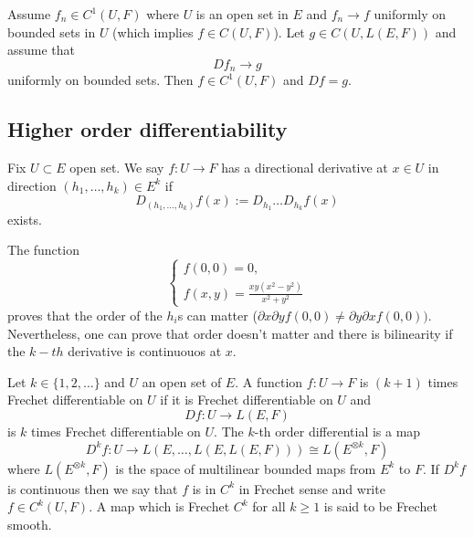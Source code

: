 \begin{prop}
    Assume $f_n \in C^1(U, F)$ where $U$ is an open set in $E$ and $f_n \rightarrow f$ uniformly on bounded sets in $U$ (which implies $f \in C(U,F)$). Let $g \in C(U, L(E,F))$ and assume that
    \begin{equation}
        Df_n \rightarrow g 
    \end{equation}
    uniformly on bounded sets. Then $f \in C^1(U, F)$ and $Df = g.$
\end{prop}

\subsection{Higher order differentiability}

\begin{definition}
    Fix $U \subset E$ open set. We say $f:U \rightarrow F$ has a directional derivative at $x \in U$ in direction $(h_1, \ldots, h_k) \in E^k$ if 
    \begin{equation}
        D_{(h_1, \ldots, h_k)} f(x) := D_{h_1} \ldots D_{h_k} f(x)
    \end{equation}
    exists.
\end{definition}

\begin{observation}
    The function 
    \begin{equation}
        \begin{cases}
            f(0,0) = 0, \\
            f(x,y) = \frac{xy (x^2 - y^2)}{x^2 + y^2}
        \end{cases}
    \end{equation}
    proves that the order of the $h_i$s can matter ($\partial x \partial y f(0,0) \neq \partial y \partial x f(0,0))$.
    Nevertheless, one can prove that order doesn't matter and there is bilinearity if the $k-th$ derivative is continuouos at $x$.
\end{observation}

\begin{definition}
    Let $k \in \{ 1, 2, \ldots\}$ and $U$ an open set of $E$. A function $f: U \rightarrow F$ is $(k + 1)$ times Frechet differentiable on $U$ if it is Frechet differentiable on $U$ and
    \begin{equation}
        Df: U \rightarrow L(E,F)
    \end{equation}
    is $k$ times Frechet differentiable on $U$. The $k$-th order differential is a map
    \begin{equation}
        D^k f: U \rightarrow L(E, \ldots, L(E, L(E, F))) \cong L(E^{\otimes k}, F)
    \end{equation}
    where $L(E^{\otimes k}, F)$ is the space of multilinear bounded maps from $E^k$ to $F$.
    If $D^k f$ is continuous then we say that $f$ is in $C^k$ in Frechet sense and write $f \in C^k(U,F).$
    A map which is Frechet $C^k$ for all $k \geq 1$ is said to be Frechet smooth.
\end{definition}

